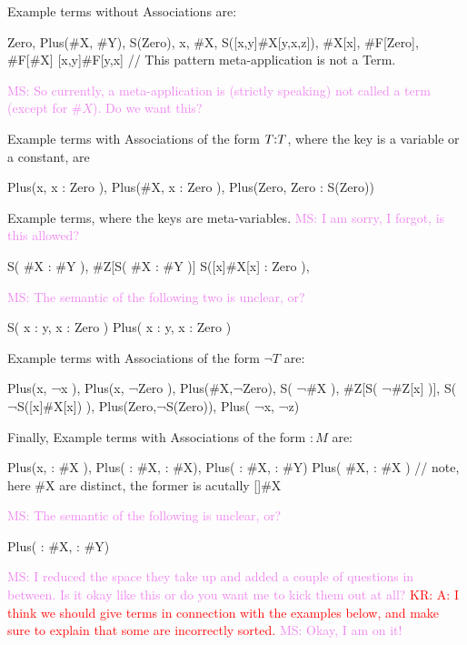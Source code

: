 \documentclass[letterpaper,11pt]{article}
\newcommand{\KR}[1]{\textcolor{red}{KR: #1}}
\newcommand{\MS}[1]{\textcolor{violet}{MS: #1}}
\begin{document}
\begin{example}
  Example terms without Associations are: 
  \begin{hacs}[numbers=right, texcl]
      Zero, Plus(#X, #Y), S(Zero), x, #X, S([x,y]#X[y,x,z]), #X[x], #F[Zero], #F[#X]
      [x,y]#F[y,x]  // This pattern meta-application is not a Term. 
    \end{hacs}
    \MS{So currently, a meta-application is (strictly speaking) not called a term (except for
      $\#X$). Do we want this?}
    
    Example terms with Associations of the form $T \kw{:} T$, where the key is a variable or a
    constant, are
    \begin{hacs}[numbers=right,texcl]
      Plus(x, { x : Zero }), Plus(#X, { x : Zero }), Plus(Zero, {Zero : S(Zero)}) 
    \end{hacs}
    
    Example terms, where the keys are meta-variables. \MS{I am sorry, I forgot, is this allowed?}
    \begin{hacs}[numbers=right,texcl]
     S({ #X : #Y }), #Z[S({ #X : #Y })]                    
     S({[x]#X[x] : Zero }), 
   \end{hacs}

   \MS{The semantic of the following two is unclear, or?}
   \begin{hacs}[numbers=right,texcl]  
     S( {x : y, x : Zero} )
     Plus( {x : y}, {x : Zero} )
   \end{hacs}
   Example terms with Associations of the form $¬T$ are:
   \begin{hacs}[numbers=right,texcl]
     Plus(x, { ¬x }), Plus(x, { ¬Zero }), Plus(#X,{¬Zero}), S({ ¬#X }), 
     #Z[S({ ¬#Z[x] })], S({ ¬S([x]#X[x]) }), Plus(Zero,{¬S(Zero)}), Plus({ ¬x}, { ¬z})
   \end{hacs}
   
   Finally, Example terms with Associations of the form $: M$ are:
   \begin{hacs}[numbers=right,texcl]
     Plus(x, { : #X }), Plus( { : #X}, { : #X}), Plus( { : #X}, { : #Y})
     Plus( #X, { : #X })  // note, here \#X are distinct, the former is acutally []\#X
   \end{hacs}
   
   \MS{The semantic of the following is unclear, or?}
   \begin{hacs}[numbers=right,texcl]
    Plus( { : #X, : #Y})
  \end{hacs}
\end{example}  
\MS{I reduced the space they take up and added a couple of questions in between. Is it okay like
  this or do you want me to kick them out at all?}  \KR{A: I think we should give terms in
  connection with the examples below, and make sure to explain that some are incorrectly sorted.}
\MS{Okay, I am on it!}
\end{document}
